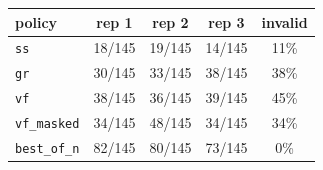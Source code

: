 \begin{tabular}{lcccc}
\toprule
policy & rep 1 & rep 2 & rep 3 & invalid \\
\midrule
\texttt{ss} & 18/145 & 19/145 & 14/145 & 11\% \\
\texttt{gr} & 30/145 & 33/145 & 38/145 & 38\% \\
\texttt{vf} & 38/145 & 36/145 & 39/145 & 45\% \\
\texttt{vf\_masked} & 34/145 & 48/145 & 34/145 & 34\% \\
\texttt{best\_of\_n} & 82/145 & 80/145 & 73/145 & 0\% \\
\bottomrule
\end{tabular}
